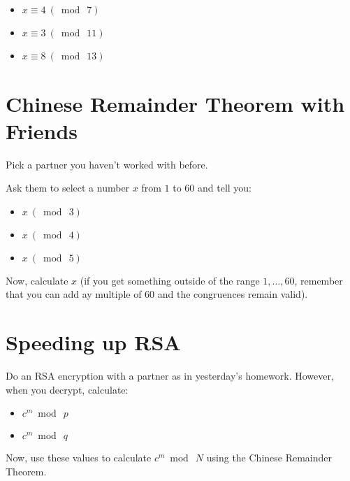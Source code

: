 \documentclass[12pt]{article}
\let\sol=\undefined
\newcommand{\sol}[1]{\begin{proof}\color{red}\textbf[SOLUTION: {#1}]\end{proof}}
\begin{document}
\sol{7}

\subsection{}

\begin{itemize}
\item $x \equiv 4 ~(\bmod~7)$
\item $x \equiv 3 ~(\bmod~11)$
\item $x \equiv 8 ~(\bmod~13)$
\end{itemize}

\sol{333}

\section{Chinese Remainder Theorem with Friends}

Pick a partner you haven't worked with before.

Ask them to select a number $x$ from $1$ to $60$ and tell you:

\begin{itemize}
\item $x ~(\bmod~3)$
\item $x ~(\bmod~4)$
\item $x ~(\bmod~5)$
\end{itemize}

Now, calculate $x$ (if you get something outside of the range $1, ..., 60$, remember that you can add ay multiple of 60 and the congruences remain valid).


\section{Speeding up RSA}

Do an RSA encryption with a partner as in yesterday's homework. However, when you decrypt, calculate:

\begin{itemize}
\item $c^m \bmod~p$
\item $c^m \bmod~q$
\end{itemize}

Now, use these values to calculate $c^m \bmod~N$ using the Chinese Remainder Theorem.
\end{document}
